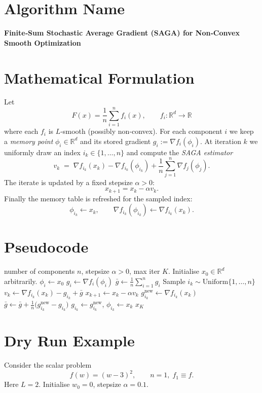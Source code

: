 \documentclass[11pt]{article}
\newcommand{\R}{\mathbb{R}}
\newcommand{\grad}{\nabla}
\begin{document}
\section*{Algorithm Name}
\textbf{Finite‑Sum Stochastic Average Gradient (SAGA) for Non‑Convex Smooth Optimization}

\section*{Mathematical Formulation}
Let 
\[
F(x)=\frac1n\sum_{i=1}^{n}f_i(x),\qquad f_i:\R^{d}\rightarrow\R
\]
where each $f_i$ is $L$‑smooth (possibly non‑convex).  
For each component $i$ we keep a \emph{memory point} $\phi_i\in\R^{d}$ and its stored gradient $g_i:=\grad f_i(\phi_i)$.  
At iteration $k$ we uniformly draw an index $i_k\in\{1,\dots ,n\}$ and compute the \emph{SAGA estimator}
\[
v_k \;=\; \grad f_{i_k}(x_k)-\grad f_{i_k}(\phi_{i_k})+\frac1n\sum_{j=1}^{n}\grad f_j(\phi_j).
\tag{1}
\]
The iterate is updated by a fixed stepsize $\alpha>0$:
\[
x_{k+1}=x_k-\alpha v_k .
\tag{2}
\]
Finally the memory table is refreshed for the sampled index:
\[
\phi_{i_k}\leftarrow x_k,\qquad 
\grad f_{i_k}(\phi_{i_k})\leftarrow\grad f_{i_k}(x_k).
\tag{3}
\]

\section*{Pseudocode}
\begin{algorithm}[H]
\caption{SAGA for non‑convex finite sum}
\begin{algorithmic}[1]
\Require number of components $n$, stepsize $\alpha>0$, max iter $K$.
\State Initialise $x_0\in\R^{d}$ arbitrarily.
    \State $\phi_i \gets x_0$ 
    \State $g_i \gets \grad f_i(\phi_i)$
\EndFor
\State $\bar g \gets \frac1n\sum_{i=1}^{n}g_i$ 
    \State Sample $i_k\sim\text{Uniform}\{1,\dots ,n\}$
    \State $v_k \gets \grad f_{i_k}(x_k)-g_{i_k}+\bar g$ 
    \State $x_{k+1} \gets x_k-\alpha v_k$ 
    \State $g_{i_k}^{\text{new}}\gets \grad f_{i_k}(x_k)$
    \State $\bar g \gets \bar g +\frac{1}{n}\bigl(g_{i_k}^{\text{new}}-g_{i_k}\bigr)$
    \State $g_{i_k}\gets g_{i_k}^{\text{new}}$,\; $\phi_{i_k}\gets x_k$ 
\EndFor
\State \Return $x_K$
\end{algorithmic}
\end{algorithm}

\section*{Dry Run Example}
Consider the scalar problem
\[
f(w)=(w-3)^2,\qquad n=1,\; f_1\equiv f .
\]
Here $L=2$. Initialise $w_0=0$, stepsize $\alpha=0.1$.
\end{document}
